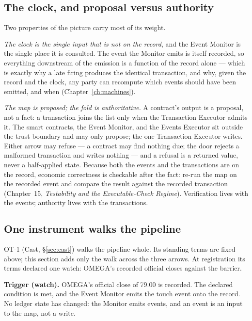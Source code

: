 \subsection{The clock, and proposal versus authority}

Two properties of the picture carry most of its weight.

\emph{The clock is the single input that is not on the record}, and the Event Monitor is
the single place it is consulted. The event the Monitor emits is itself recorded, so
everything downstream of the emission is a function of the record alone --- which is
exactly why a late firing produces the identical transaction, and why, given the record
and the clock, any party can recompute which events should have been emitted, and when
(Chapter~\ref{ch:machines}).

\emph{The map is proposed; the fold is authoritative.} A contract's output is a proposal,
not a fact: a transaction joins the list only when the Transaction Executor admits it. The
smart contracts, the Event Monitor, and the Events Executor sit outside the trust boundary
and may only propose; the one Transaction Executor writes. Either arrow may refuse --- a
contract may find nothing due; the door rejects a malformed transaction and writes nothing
--- and a refusal is a returned value, never a half-applied state. Because both the events
and the transactions are on the record, economic correctness is checkable after the fact:
re-run the map on the recorded event and compare the result against the recorded
transaction (Chapter~15, \emph{Testability and the Executable-Check Regime}). Verification
lives with the events; authority lives with the transactions.

\subsection{One instrument walks the pipeline}

OT-1 (Cast, \S\ref{sec:cast}) walks the pipeline whole. Its standing terms are fixed above;
this section adds only the walk across the three arrows. At registration its terms declared
one watch: OMEGA's recorded official closes against the barrier.

\textbf{Trigger (watch).} OMEGA's official close of 79.00 is recorded. The declared
condition is met, and the Event Monitor emits the touch event
onto the record. No ledger state has changed: the Monitor emits events, and an event is an
input to the map, not a write.

